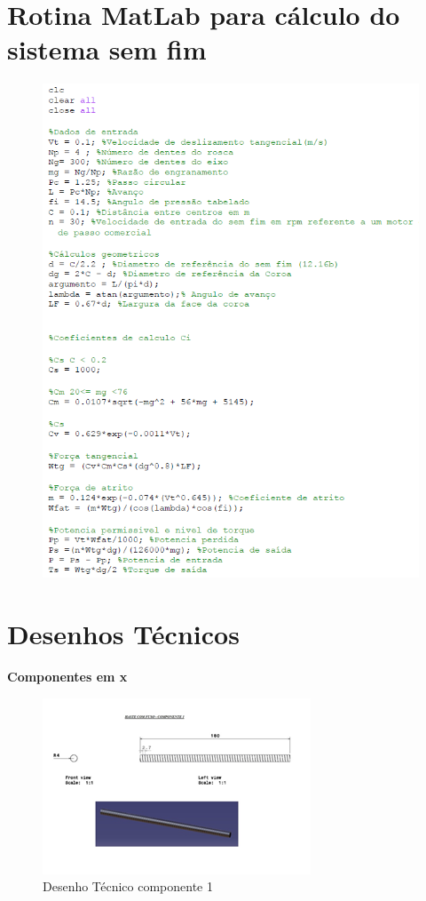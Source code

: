 \begin{apendicesenv}

\chapter{Rotina MatLab para cálculo do sistema sem fim}

\begin{figure}[H]
		\centering
			\includegraphics[scale=1.0]{figuras/matlabsemfim.png}
		\label{matlabsemfim}
\end{figure}

\chapter{Desenhos Técnicos}

\textbf{Componentes em x}

\begin{figure}[H]
		\centering
			\includegraphics[scale=1.0]{figuras/tec1.png}
		\caption{Desenho Técnico componente 1}
		\label{tec1}
\end{figure}


\end{apendicesenv}
